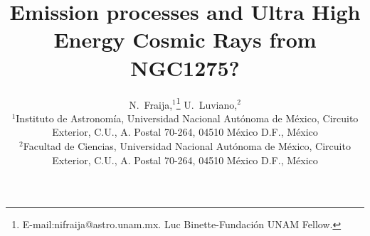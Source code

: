 \documentclass[useAMS,usenatbib,a4]{mn2e}
\begin{document}
\title[Emission processes and  Ultra High Energy Cosmic Rays  from NGC1275?]
{Emission processes and  Ultra High Energy Cosmic Rays  from NGC1275?}
%
%

\author[N. Fraija et al.]
  {N.~Fraija,$^1$\thanks{E-mail:nifraija@astro.unam.mx. Luc Binette-Fundaci\'on UNAM Fellow.}
    U.~Luviano,$^2$\\
    $^1$Instituto de Astronom\' ia, Universidad Nacional Aut\'onoma de M\'exico, Circuito Exterior,
C.U., A. Postal 70-264, 04510 M\'exico D.F., M\'exico\\
        $^2$Facultad de Ciencias, Universidad Nacional Aut\'onoma de M\'exico, Circuito Exterior,
C.U., A. Postal 70-264, 04510 M\'exico D.F., M\'exico}

%



\maketitle
	
\end{document}
